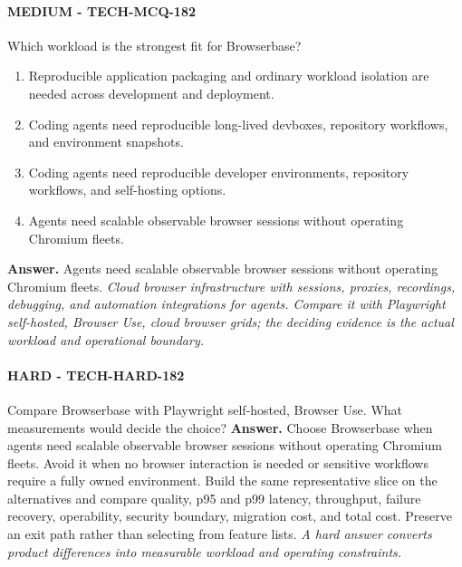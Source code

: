 \paragraph{MEDIUM - TECH-MCQ-182} Which workload is the strongest fit for Browserbase?
\begin{enumerate}[label=\Alph*.]
\item Reproducible application packaging and ordinary workload isolation are needed across development and deployment.
\item Coding agents need reproducible long-lived devboxes, repository workflows, and environment snapshots.
\item Coding agents need reproducible developer environments, repository workflows, and self-hosting options.
\item Agents need scalable observable browser sessions without operating Chromium fleets.
\end{enumerate}
\textbf{Answer.} Agents need scalable observable browser sessions without operating Chromium fleets.
\textit{Cloud browser infrastructure with sessions, proxies, recordings, debugging, and automation integrations for agents. Compare it with Playwright self-hosted, Browser Use, cloud browser grids; the deciding evidence is the actual workload and operational boundary.}
\paragraph{HARD - TECH-HARD-182} Compare Browserbase with Playwright self-hosted, Browser Use. What measurements would decide the choice?
\textbf{Answer.} Choose Browserbase when agents need scalable observable browser sessions without operating Chromium fleets. Avoid it when no browser interaction is needed or sensitive workflows require a fully owned environment. Build the same representative slice on the alternatives and compare quality, p95 and p99 latency, throughput, failure recovery, operability, security boundary, migration cost, and total cost. Preserve an exit path rather than selecting from feature lists.
\textit{A hard answer converts product differences into measurable workload and operating constraints.}
